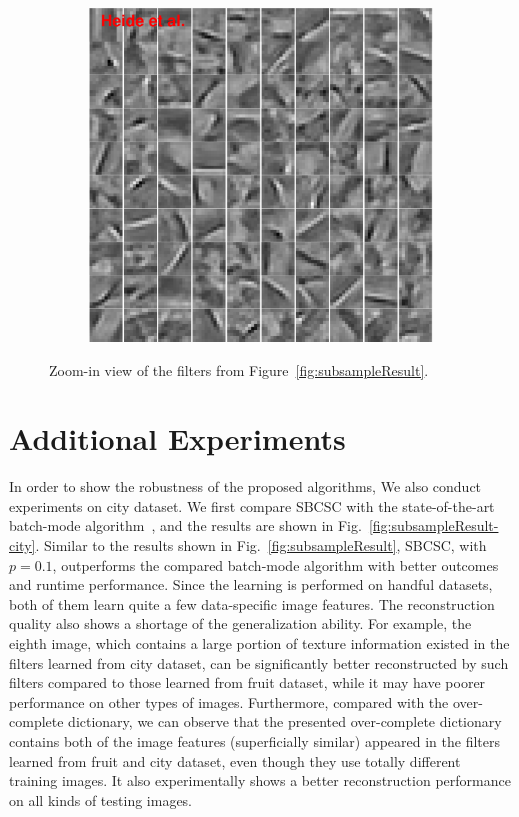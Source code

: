\begin{figure}[h]
\begin{subfigure}{0.49\textwidth}
  \includegraphics[width=1\linewidth]{figure/heideFruit100.pdf}
  \end{subfigure}
\caption{Zoom-in view of the filters from Figure~\ref{fig:subsampleResult}.}
\end{figure}


\section{Additional Experiments}
In order to show the robustness of the proposed algorithms, We also conduct experiments on city dataset. We first compare SBCSC with the state-of-the-art batch-mode algorithm~\cite{heide2015fast}, and the results are shown in Fig.\ \ref{fig:subsampleResult-city}. Similar to the results shown in Fig.\ \ref{fig:subsampleResult}, SBCSC, with $p=0.1$, outperforms the compared batch-mode algorithm with better outcomes and runtime performance. Since the learning is performed on handful datasets, both of them learn quite a few data-specific image features. The reconstruction quality also shows a shortage of the generalization ability. For example, the eighth image, which contains a large portion of texture information existed in the filters learned from city dataset, can be significantly better reconstructed by such filters compared to those learned from fruit dataset, while it may have poorer performance on other types of images. Furthermore, compared with the over-complete dictionary, we can observe that the presented over-complete dictionary contains both of the image features (superficially similar) appeared in the filters learned from fruit and city dataset, even though they use totally different training images. It also experimentally shows a better reconstruction performance on all kinds of testing images.

